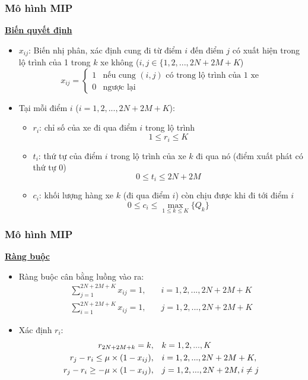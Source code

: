 \documentclass{beamer}
\begin{document}
	\begin{frame}
		\frametitle{Mô hình MIP}
		\textbf{\underline{Biến quyết định}}
		\begin{itemize}
			\item $x_{ij}$: Biến nhị phân, xác định cung đi từ điểm $i$ đến điểm $j$ có xuất hiện trong lộ trình của 1 trong $k$ xe không ($i,j\in \{1,2,...,2N+2M+K$)
			\begin{equation}
				x_{ij} = 
				\begin{cases}
					1 & \text{nếu cung $(i,j)$ có trong lộ trình của 1 xe}\\
					0 & \text{ngược lại}
				\end{cases}
			\end{equation}
			\item Tại mỗi điểm $i$ ($i=1,2,...,2N+2M+K$):
			\begin{itemize}
				\item $r_i$: chỉ số của xe đi qua điểm $i$ trong lộ trình
				\begin{equation}
					1\leq r_i\leq K
				\end{equation}
				\item $t_i$: thứ tự của điểm $i$ trong lộ trình của xe $k$ đi qua nó (điểm xuất phát có thứ tự 0)
				\begin{equation}
					0\leq t_i\leq 2N+2M
				\end{equation}
				\item $c_i$: khối lượng hàng xe $k$ (đi qua điểm $i$) còn chịu được khi đi tới điểm $i$
				\begin{equation}
					0\leq c_i\leq \max _{1\leq k\leq K} \{Q_k\}
				\end{equation}
			\end{itemize}
		\end{itemize}
		
	\end{frame}
	\begin{frame}
		\frametitle{Mô hình MIP}
		\textbf{\underline{Ràng buộc}}
		\begin{itemize}
			\item Ràng buộc cân bằng luồng vào ra:
			\begin{align}
				\sum_{j=1}^{2N+2M+K} x_{ij} = 1,\quad & i=1,2,...,2N+2M+K \\
				\sum_{i=1}^{2N+2M+K} x_{ij} = 1,\quad & j=1,2,...,2N+2M+K
			\end{align}
			\item Xác định $r_i$:
			\begin{align}
				r_{2N+2M+k} = k,\quad & k=1,2,...,K \\
				r_j - r_i\leq \mu\times (1 - x_{ij}),\quad & i=1,2,...,2N+2M+K, \\
				r_j - r_i\geq -\mu\times (1 -x_{ij}),\quad & j=1,2,...,2N+2M, i\ne j \notag
			\end{align}
		\end{itemize}
	\end{frame}
\end{document}
